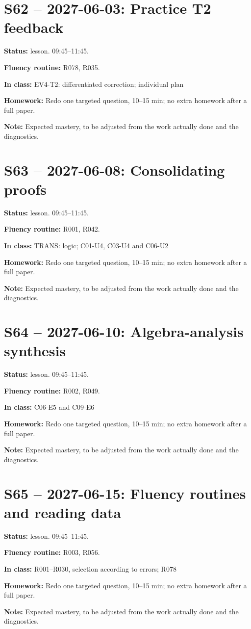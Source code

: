\section*{S62 -- 2027-06-03: Practice T2 feedback}
\textbf{Status:} lesson. 09:45–11:45.\par\textbf{Fluency routine:} R078, R035.\par\textbf{In class:} EV4-T2: differentiated correction; individual plan\par\textbf{Homework:} Redo one targeted question, 10–15 min; no extra homework after a full paper.\par\textbf{Note:} Expected mastery, to be adjusted from the work actually done and the diagnostics.
\section*{S63 -- 2027-06-08: Consolidating proofs}
\textbf{Status:} lesson. 09:45–11:45.\par\textbf{Fluency routine:} R001, R042.\par\textbf{In class:} TRANS: logic; C01-U4, C03-U4 and C06-U2\par\textbf{Homework:} Redo one targeted question, 10–15 min; no extra homework after a full paper.\par\textbf{Note:} Expected mastery, to be adjusted from the work actually done and the diagnostics.
\section*{S64 -- 2027-06-10: Algebra-analysis synthesis}
\textbf{Status:} lesson. 09:45–11:45.\par\textbf{Fluency routine:} R002, R049.\par\textbf{In class:} C06-E5 and C09-E6\par\textbf{Homework:} Redo one targeted question, 10–15 min; no extra homework after a full paper.\par\textbf{Note:} Expected mastery, to be adjusted from the work actually done and the diagnostics.
\section*{S65 -- 2027-06-15: Fluency routines and reading data}
\textbf{Status:} lesson. 09:45–11:45.\par\textbf{Fluency routine:} R003, R056.\par\textbf{In class:} R001–R030, selection according to errors; R078\par\textbf{Homework:} Redo one targeted question, 10–15 min; no extra homework after a full paper.\par\textbf{Note:} Expected mastery, to be adjusted from the work actually done and the diagnostics.
